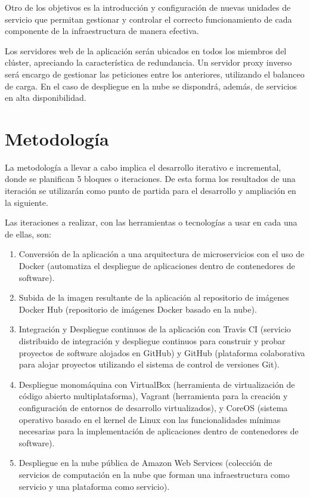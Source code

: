 Otro de los objetivos es la introducción y configuración de nuevas unidades de servicio que permitan gestionar y controlar el correcto funcionamiento de cada componente de la infraestructura de manera efectiva.

Los servidores web de la aplicación serán ubicados en todos los miembros del clúster, apreciando la característica de redundancia. Un servidor proxy inverso será encargo de gestionar las peticiones entre los anteriores, utilizando el balanceo de carga. En el caso de despliegue en la nube se dispondrá, además, de servicios en alta disponibilidad.

\section{Metodología}

La metodología a llevar a cabo implica el desarrollo iterativo e incremental, donde se planifican 5 bloques o iteraciones. De esta forma los resultados de una iteración se utilizarán como punto de partida para el desarrollo y ampliación en la siguiente. 

Las iteraciones a realizar, con las herramientas o tecnologías a usar en cada una de ellas, son:
\begin{enumerate}
\item Conversión de la aplicación a una arquitectura de microservicios con el uso de Docker (automatiza el despliegue de aplicaciones dentro de contenedores de software).
\item Subida de la imagen resultante de la aplicación al repositorio de imágenes Docker Hub (repositorio de imágenes Docker basado en la nube).
\item Integración y Despliegue continuos de la aplicación con Travis CI (servicio distribuido de integración y despliegue continuos para construir y probar proyectos de software alojados en GitHub) y GitHub (plataforma colaborativa para alojar proyectos utilizando el sistema de control de versiones Git).
\item Despliegue monomáquina con VirtualBox (herramienta de virtualización de código abierto multiplataforma), Vagrant (herramienta para la creación y configuración de entornos de desarrollo virtualizados), y CoreOS (sistema operativo basado en el kernel de Linux con las funcionalidades mínimas necesarias para la implementación de aplicaciones dentro de contenedores de software).
\item Despliegue en la nube pública de Amazon Web Services (colección de servicios de computación en la nube que forman una infraestructura como servicio y una plataforma como servicio).
\end{enumerate}

